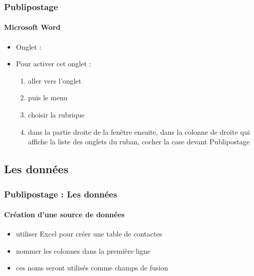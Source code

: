 \documentclass[xcolor=table]{beamer}
\begin{document}
\begin{frame}
\frametitle{Publipostage}
\framesubtitle{Microsoft Word}
 
\begin{itemize}
	\item Onglet : 
	\item Pour activer cet onglet : 
	\begin{enumerate}
		\item aller vers l'onglet 
		\item puis le menu 
		\item choisir la rubrique 
		\item dans la partie droite de la fenêtre ensuite, dans la colonne de droite qui affiche la liste des onglets du ruban, cocher la case devant Publipostage
	\end{enumerate}
\end{itemize}



\end{frame}

\subsection{Les données}

\begin{frame}
\frametitle{Publipostage : Les données}
\framesubtitle{Création d'une source de données}

\begin{minipage}{0.40\textwidth}
	\begin{itemize}
		\item utiliser Excel pour créer une table de contactes
		\item nommer les colonnes dans la première ligne
		\item ces noms seront utilisés comme champs de fusion
	\end{itemize}
\end{minipage}
\begin{minipage}{0.59\textwidth}
\end{minipage}

\end{frame}
\end{document}
